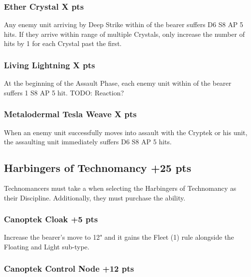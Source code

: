 \subsubsection[Ether Crystal ]{Ether Crystal  \hrulefill X pts}

Any enemy unit arriving by Deep Strike within  of the bearer suffers D6 S8 AP 5 hits. If they arrive within range of multiple Crystals, only increase the number of hits by 1 for each Crystal past the first.

\subsubsection[Living Lightning ]{Living Lightning  \hrulefill X pts}

At the beginning of the Assault Phase, each enemy unit within  of the bearer suffers 1 S8 AP 5 hit. TODO: Reaction?

\subsubsection[Metalodermal Tesla Weave ]{Metalodermal Tesla Weave  \hrulefill X pts}

When an enemy unit successfully moves into assault with the Cryptek or his unit, the assaulting unit immediately suffers D6 S8 AP 5 hits.




\subsection[Harbingers of Technomancy ]{Harbingers of Technomancy  \hrulefill +25 pts}

Technomancers must take a  when selecting the Harbingers of Technomancy as their Discipline. Additionally, they must purchase the  ability.

\subsubsection[Canoptek Cloak ]{Canoptek Cloak  \hrulefill +5 pts}

Increase the bearer's move to 12" and it gains the Fleet (1) rule alongside the Floating and Light sub-type.

\subsubsection[Canoptek Control Node ]{Canoptek Control Node  \hrulefill +12 pts}

